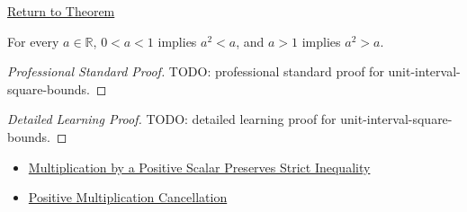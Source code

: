 \newpage
{}
\label{prf:unit-interval-square-bounds}

\begin{remark*}[Return]
\hyperref[thm:unit-interval-square-bounds]{Return to Theorem}
\end{remark*}

\begin{theorem*}
For every $a\in\mathbb{R}$, $0<a<1$ implies $a^2<a$, and $a>1$ implies
$a^2>a$.
\end{theorem*}

\begin{proof}[Professional Standard Proof]
\LRAProofBodyStart
TODO: professional standard proof for unit-interval-square-bounds.
\end{proof}

\begin{proof}[Detailed Learning Proof]
\LRAProofBodyStart
TODO: detailed learning proof for unit-interval-square-bounds.
\end{proof}

\begin{remark*}
\end{remark*}

\begin{dependencies}
\begin{itemize}
  \item \hyperref[thm:ineq-multiply-positive]{Multiplication by a Positive Scalar Preserves Strict Inequality}
  \item \hyperref[lem:positive-multiplication-cancellation]{Positive Multiplication Cancellation}
\end{itemize}
\end{dependencies}

\clearpage

